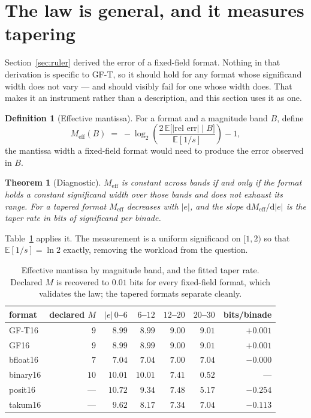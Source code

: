 \documentclass[11pt]{article}
\newtheorem{theorem}{Theorem}
\theoremstyle{definition}
\newtheorem{definition}{Definition}
\begin{document}
\section{The law is general, and it measures tapering}\label{sec:law}

Section~\ref{sec:ruler} derived the error of a fixed-field format. Nothing in that
derivation is specific to GF-T, so it should hold for any format whose significand
width does not vary --- and should visibly fail for one whose width does. That
makes it an instrument rather than a description, and this section uses it as one.

\begin{definition}[Effective mantissa]
For a format and a magnitude band $B$, define
\[
  M_{\mathrm{eff}}(B) \;=\; -\log_2\!\left(\frac{2\,\mathbb{E}\bigl[|\text{rel err}|\;\big|\;B\bigr]}{\mathbb{E}[1/s]}\right) - 1 ,
\]
the mantissa width a fixed-field format would need to produce the error observed
in $B$.
\end{definition}

\begin{theorem}[Diagnostic]\label{thm:diag}
$M_{\mathrm{eff}}$ is constant across bands if and only if the format holds a
constant significand width over those bands and does not exhaust its range. For a
tapered format $M_{\mathrm{eff}}$ decreases with $|e|$, and the slope
$\mathrm{d}M_{\mathrm{eff}}/\mathrm{d}|e|$ is the taper rate in bits of
significand per binade.
\end{theorem}

Table~\ref{tab:meff} applies it. The measurement is a uniform significand on
$[1,2)$ so that $\mathbb{E}[1/s] = \ln 2$ exactly, removing the workload from the
question.

\begin{table}[t]\centering
\caption{Effective mantissa by magnitude band, and the fitted taper rate. Declared
$M$ is recovered to $0.01$ bits for every fixed-field format, which validates the
law; the tapered formats separate cleanly.}
\label{tab:meff}
\begin{tabular}{lrrrrrr}
\toprule
format & declared $M$ & $|e|\,0$--$6$ & $6$--$12$ & $12$--$20$ & $20$--$30$ & bits/binade \\
\midrule
GF-T16   & $9$  & $8.99$  & $8.99$ & $9.00$ & $9.01$ & $+0.001$ \\
GF16     & $9$  & $8.99$  & $8.99$ & $9.00$ & $9.01$ & $+0.001$ \\
bfloat16 & $7$  & $7.04$  & $7.04$ & $7.00$ & $7.04$ & $-0.000$ \\
binary16 & $10$ & $10.01$ & $10.01$ & $7.41$ & $0.52$ & --- \\
posit16  & ---  & $10.72$ & $9.34$ & $7.48$ & $5.17$ & $\mathbf{-0.254}$ \\
takum16  & ---  & $9.62$  & $8.17$ & $7.34$ & $7.04$ & $\mathbf{-0.113}$ \\
\bottomrule
\end{tabular}
\end{table}
\end{document}
